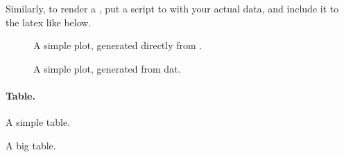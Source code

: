 Similarly, to render a , put a 
script to  with your actual data, 
and include it to the latex like below.

\begin{figure}[h]
\centering
\footnotesize
{}
\caption{A simple plot, generated directly from .}
\label{f:gaussian}
\end{figure}

\begin{figure}[h]
\centering
\footnotesize
{}
\caption{A simple plot, generated from dat.}
\label{f:plot}
\end{figure}

\paragraph{Table.}

\begin{table}[h]
\centering
\footnotesize

\caption{A simple table.}
\label{t:simple}
\end{table}

\begin{table*}[t]
\centering
\footnotesize

\caption{A big table.}
\label{t:big}
\end{table*}
